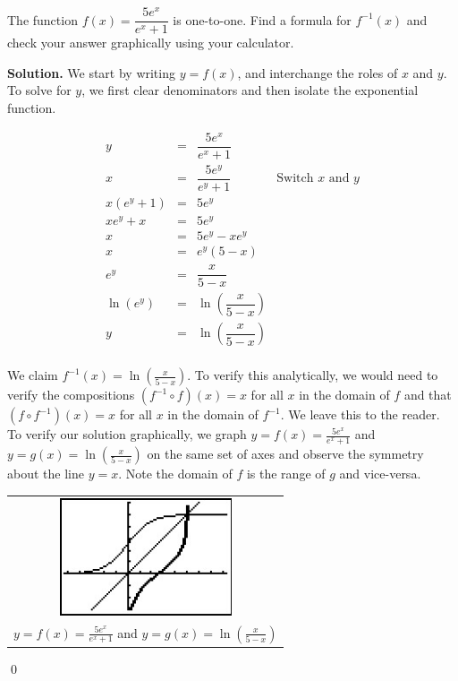 \begin{ex}  \label{expfracinverse} The function $f(x) = \dfrac{5e^{x}}{e^{x}+1}$ is one-to-one.  Find a formula for $f^{-1}(x)$ and check your answer graphically using your calculator.

{\bf Solution.}  We start by writing $y=f(x)$, and interchange the roles of $x$ and $y$.  To solve for $y$, we first clear denominators and then isolate the exponential function.

\[ \begin{array}{rclr}
y & = & \dfrac{5e^{x}}{e^{x}+1} & \\ [12pt]
x & = & \dfrac{5e^{y}}{e^{y}+1} & \mbox{Switch $x$ and $y$} \\ [12pt]
x \left(e^{y}+1\right) & = & 5e^{y} & \\ [4pt]
x e^{y}+x & = & 5e^{y} & \\ [4pt]
x & = & 5e^{y} - x e^{y} & \\ [4pt]
x & = & e^{y}(5 - x) & \\ [4pt]
e^{y}& = & \dfrac{x}{5-x} & \\[12pt]
\ln\left(e^{y}\right) & = & \ln\left(\dfrac{x}{5-x}\right) & \\[12pt]
y & = & \ln\left(\dfrac{x}{5-x}\right) & \\
\end{array}\]

We claim $f^{-1}(x) = \ln\left(\frac{x}{5-x}\right)$.  To verify this analytically, we would need to verify the compositions $\left(f^{-1} \circ f\right)(x) = x$ for all $x$ in the domain of $f$ and that $\left(f \circ f^{-1}\right)(x) = x$ for all $x$ in the domain of $f^{-1}$.  We leave this to the reader.  To verify our solution graphically, we graph $y = f(x) = \frac{5e^{x}}{e^{x}+1}$ and $y = g(x) = \ln\left(\frac{x}{5-x}\right)$ on the same set of axes and observe the symmetry about the line $y=x$.  Note the domain of $f$ is the range of $g$ and vice-versa.

\begin{center}
\begin{tabular}{c}

\includegraphics[width=2in]{./ExpLogsGraphics/ExpEqns10.jpg} \\

$y = f(x) = \frac{5e^{x}}{e^{x}+1}$ and \boldmath $y = g(x) = \ln\left(\frac{x}{5-x}\right)$ \\

\end{tabular}
\end{center}

\qed

\end{ex}

